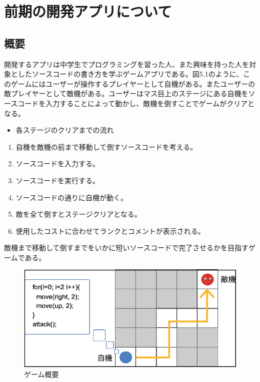 \documentclass[openany,11pt,papersize]{jsbook}
\begin{document}


\chapter{前期の開発アプリについて}
\section{概要}
開発するアプリは中学生でプログラミングを習った人、また興味を持った人を対象としたソースコードの書き方を学ぶゲームアプリである。図5.1のように、このゲームにはユーザーが操作するプレイヤーとして自機がある。またユーザーの敵プレイヤーとして敵機がある。ユーザーはマス目上のステージにある自機をソースコードを入力することによって動かし、敵機を倒すことでゲームがクリアとなる。

\begin{itemize}
\item 各ステージのクリアまでの流れ
\end{itemize}
\begin{enumerate}
\item 自機を敵機の前まで移動して倒すソースコードを考える。
\item ソースコードを入力する。
\item ソースコードを実行する。
\item ソースコードの通りに自機が動く。
\item 敵を全て倒すとステージクリアとなる。
\item 使用したコストに合わせてランクとコメントが表示される。
\end{enumerate}
\par 敵機まで移動して倒すまでをいかに短いソースコードで完了させるかを目指すゲームである。

\begin{figure}[h]
\begin{center}
\includegraphics[width=12cm, bb=0 0 573 263]{img/5thParagraph/game.png}
\end{center}
\caption{ゲーム概要}
\end{figure}
\end{document}
